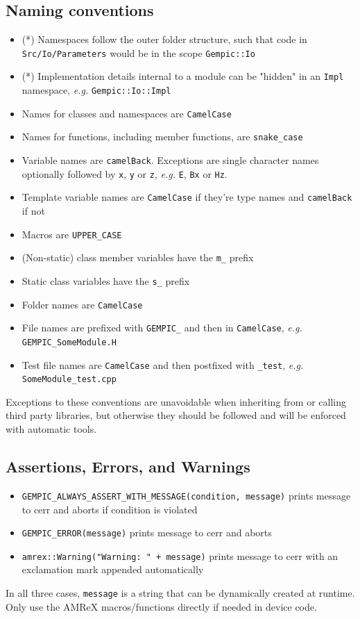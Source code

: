 \documentclass[11pt]{article}
\begin{document}
\subsection{Naming conventions}
\begin{itemize}
    \item (*) Namespaces follow the outer folder structure, such that code in \verb|Src/Io/Parameters| would be in the scope \lstinline{Gempic::Io}
    \item (*) Implementation details internal to a module can be "hidden" in an \verb|Impl| namespace, \emph{e.g.} \verb|Gempic::Io::Impl|
    \item Names for classes and namespaces are \verb|CamelCase|
    \item Names for functions, including member functions, are \verb|snake_case|
    \item Variable names are \verb|camelBack|. Exceptions are single character names optionally followed by \lstinline{x}, \lstinline{y} or \lstinline{z}, \emph{e.g.} \verb|E|, \lstinline{Bx} or \lstinline{Hz}.
    \item Template variable names are \verb|CamelCase| if they're type names and \verb|camelBack| if not
    \item Macros are \lstinline{UPPER_CASE}
    \item (Non-static) class member variables have the \lstinline{m_} prefix
    \item Static class variables have the \lstinline{s_} prefix
    \item Folder names are \verb|CamelCase|
    \item File names are prefixed with \verb|GEMPIC_| and then in \verb|CamelCase|, \emph{e.g.} \verb|GEMPIC_SomeModule.H|
    \item Test file names are \verb|CamelCase| and then postfixed with \verb|_test|, \emph{e.g.} \verb|SomeModule_test.cpp|
\end{itemize}
Exceptions to these conventions are unavoidable when inheriting from or calling third party libraries, but otherwise they should be followed and will be enforced with automatic tools.

\subsection{Assertions, Errors, and Warnings}
\begin{itemize}
    \item \lstinline{GEMPIC_ALWAYS_ASSERT_WITH_MESSAGE(condition, message)} prints message to cerr and aborts if condition is violated
    \item \lstinline{GEMPIC_ERROR(message)} prints message to cerr and aborts
    \item \lstinline{amrex::Warning("Warning: " + message)} prints message to cerr with an exclamation mark appended automatically
\end{itemize}
In all three cases, \lstinline{message} is a string that can be dynamically created at runtime. Only use the AMReX macros/functions directly if needed in device code.
\end{document}
